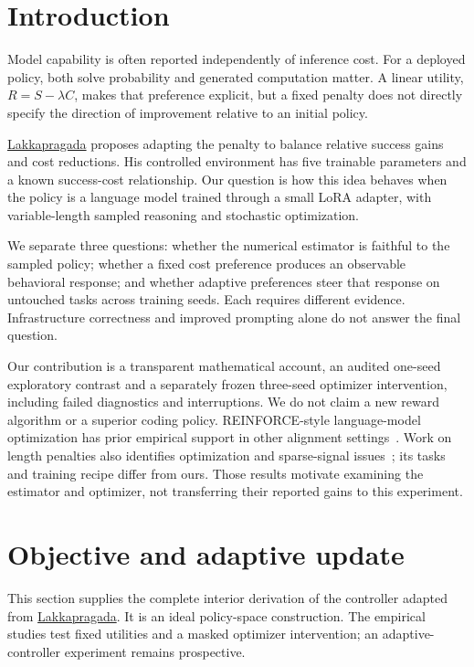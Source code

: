 \documentclass[11pt]{article}
\begin{document}
\section{Introduction}

Model capability is often reported independently of inference cost. For a deployed policy, both solve probability and generated computation matter. A linear utility, \(R=S-\lambda C\), makes that preference explicit, but a fixed penalty does not directly specify the direction of improvement relative to an initial policy.

\href{https://anishlk.com/swe-2-extended/}{Lakkapragada} proposes adapting the penalty to balance relative success gains and cost reductions. His controlled environment has five trainable parameters and a known success-cost relationship. Our question is how this idea behaves when the policy is a language model trained through a small LoRA adapter, with variable-length sampled reasoning and stochastic optimization.

We separate three questions: whether the numerical estimator is faithful to the sampled policy; whether a fixed cost preference produces an observable behavioral response; and whether adaptive preferences steer that response on untouched tasks across training seeds. Each requires different evidence. Infrastructure correctness and improved prompting alone do not answer the final question.

Our contribution is a transparent mathematical account, an audited one-seed exploratory contrast and a separately frozen three-seed optimizer intervention, including failed diagnostics and interruptions. We do not claim a new reward algorithm or a superior coding policy. REINFORCE-style language-model optimization has prior empirical support in other alignment settings~\cite{rloo}. Work on length penalties also identifies optimization and sparse-signal issues~\cite{dler}; its tasks and training recipe differ from ours. Those results motivate examining the estimator and optimizer, not transferring their reported gains to this experiment.

\section{Objective and adaptive update}
\label{sec:objective}

This section supplies the complete interior derivation of the controller adapted from \href{https://anishlk.com/swe-2-extended/}{Lakkapragada}. It is an ideal policy-space construction. The empirical studies test fixed utilities and a masked optimizer intervention; an adaptive-controller experiment remains prospective.
\end{document}
